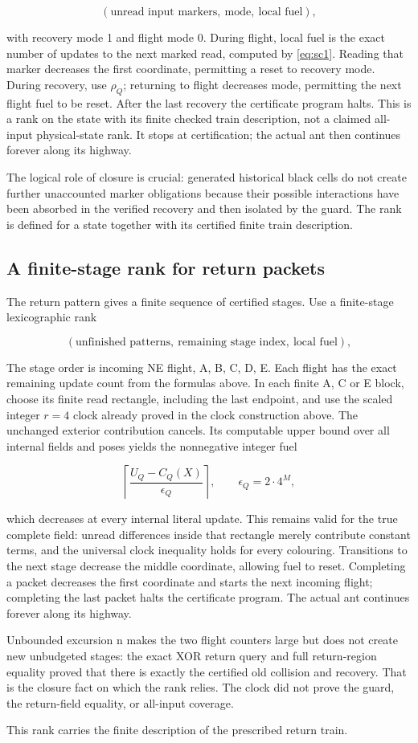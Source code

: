 \[
(\text{unread input markers},\ \text{mode},\ \text{local fuel}),
\]

with recovery mode 1 and flight mode 0. During flight, local fuel is the
exact number of updates to the next marked read, computed by \eqref{eq:sc1}.
Reading that marker decreases the first coordinate, permitting a reset
to recovery mode. During recovery, use $\rho_Q$; returning to flight
decreases mode, permitting the next flight fuel to be reset. After the
last recovery the certificate program halts. This is a rank on the state
with its finite checked train description, not a claimed all-input
physical-state rank. It stops at certification; the actual ant then
continues forever along its highway.

The logical role of closure is crucial: generated historical black cells
do not create further unaccounted marker obligations because their
possible interactions have been absorbed in the verified recovery and
then isolated by the guard. The rank is defined for a state together
with its certified finite train description.

\subsection{A finite-stage rank for return packets}\label{returns-9}

The return pattern gives a finite sequence of certified stages. Use a finite-stage
lexicographic rank

\[
(\text{unfinished patterns},\ \text{remaining stage index},\ \text{local fuel}),
\]

The stage order is incoming NE flight, A, B, C, D, E. Each flight has
the exact remaining update count from the formulas above. In each finite
A, C or E block, choose its finite read rectangle, including the last
endpoint, and use the scaled integer $r=4$ clock already proved in
the clock construction above. The unchanged exterior contribution cancels. Its computable
upper bound over all internal fields and poses yields the nonnegative
integer fuel

\[
\left\lceil\frac{U_Q-C_Q(X)}{\epsilon_Q}\right\rceil,\qquad\epsilon_Q=2\cdot4^M,
\]

which decreases at every internal literal update. This remains valid for
the true complete field: unread differences inside that rectangle merely
contribute constant terms, and the universal clock inequality holds for
every colouring. Transitions to the next stage decrease the middle
coordinate, allowing fuel to reset. Completing a packet decreases the
first coordinate and starts the next incoming flight; completing the
last packet halts the certificate program. The actual ant continues
forever along its highway.

Unbounded excursion n makes the two flight counters large but does not
create new unbudgeted stages: the exact XOR return query and full
return-region equality proved that there is exactly the certified old
collision and recovery. That is the closure fact on which the rank
relies. The clock did not prove the guard, the return-field equality, or
all-input coverage.

This rank carries the finite description of the prescribed return train.
